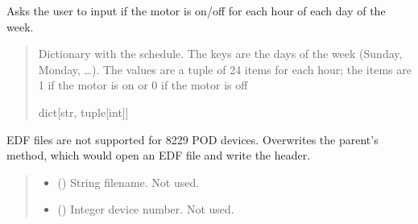 \documentclass[letterpaper,10pt,english]{sphinxmanual}
\begin{document}
\begin{fulllineitems}
\begin{fulllineitems}
\label{\detokenize{Setup_8229:Setup_8229.Setup_8229._GetScheduleForWeek}}
\pysigstartsignatures
{}
\pysigstopsignatures
\sphinxAtStartPar
Asks the user to input if the motor is on/off for each hour of each             day of the week.
\begin{quote}\begin{description}
\sphinxAtStartPar
Dictionary with the schedule. The keys are the                 days of the week (Sunday, Monday, …). The values are a tuple of 24                 items for each hour; the items are 1 if the motor is on or 0 if the                 motor is off

\sphinxAtStartPar
dict{[}str, tuple{[}int{]}{]}

\end{description}\end{quote}

\end{fulllineitems}


\begin{fulllineitems}
\label{\detokenize{Setup_8229:Setup_8229.Setup_8229._OpenSaveFile_EDF}}
\pysigstartsignatures
{}
\pysigstopsignatures
\sphinxAtStartPar
EDF files are not supported for 8229 POD devices. Overwrites the         parent’s method, which would open an EDF file and write the header.
\begin{quote}\begin{description}
\begin{itemize}
\item {} 
\sphinxAtStartPar
{} () \textendash{} String filename. Not used.

\item {} 
\sphinxAtStartPar
{} () \textendash{} Integer device number. Not used.


\end{itemize}
\end{description}
\end{quote}
\end{fulllineitems}
\end{fulllineitems}
\end{document}
